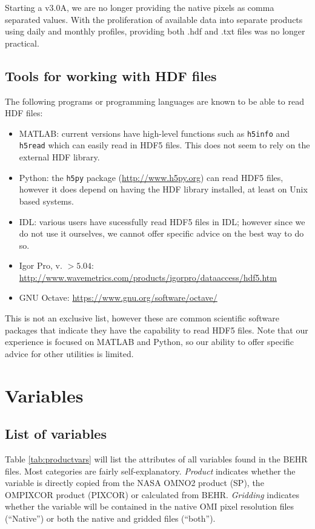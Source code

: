 \documentclass[12pt]{article}
\begin{document}
	Starting a v3.0A, we are no longer providing the native pixels as comma separated values. With the proliferation of available data into separate products using daily and monthly profiles, providing both .hdf and .txt files was no longer practical.
	
	\subsection{Tools for working with HDF files}
	The following programs or programming languages are known to be able to read HDF files:
	\begin{itemize}
		\item MATLAB: current versions have high-level functions such as \texttt{h5info} and \texttt{h5read} which can easily read in HDF5 files. This does not seem to rely on the external HDF library.
		\item Python: the \texttt{h5py} package (\url{http://www.h5py.org}) can read HDF5 files, however it does depend on having the HDF library installed, at least on Unix based systems. 
		\item IDL: various users have sucessfully read HDF5 files in IDL; however since we do not use it ourselves, we cannot offer specific advice on the best way to do so. 
		\item Igor Pro, v. $>5.04$: \url{http://www.wavemetrics.com/products/igorpro/dataaccess/hdf5.htm}
		\item GNU Octave: \url{https://www.gnu.org/software/octave/}
	\end{itemize}
	
	This is not an exclusive list, however these are common scientific software packages that indicate they have the capability to read HDF5 files. Note that our experience is focused on MATLAB and Python, so our ability to offer specific advice for other utilities is limited.
	
	
\section{Variables}
\subsection{List of variables}
	Table \ref{tab:productvars} will list the attributes of all variables found in the BEHR files. Most categories are fairly self-explanatory. \emph{Product} indicates whether the variable is directly copied from the NASA OMNO2 product (SP), the OMPIXCOR product (PIXCOR) or calculated from BEHR. \emph{Gridding} indicates whether the variable will be contained in the native OMI pixel resolution files (``Native'') or both the native and gridded files (``both'').
	
\end{document}
